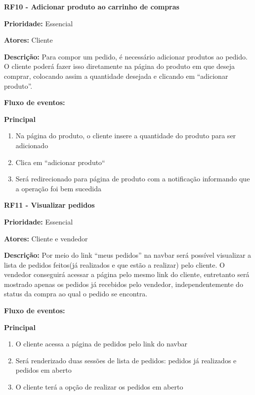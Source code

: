 \begin{apendicesenv}
\textbf{RF10 - Adicionar produto ao carrinho de compras} \par
\textbf{Prioridade:} Essencial \par
\textbf{Atores:} Cliente \par
\textbf{Descrição:} Para compor um pedido, é necessário adicionar produtos ao pedido. O cliente poderá fazer isso diretamente na página do produto em que deseja comprar, colocando assim a quantidade desejada e clicando em “adicionar produto”. \par
\textbf{Fluxo de eventos:} \par
\textbf{Principal} \par
\begin{enumerate}
  \item Na página do produto, o cliente insere a quantidade do produto para ser adicionado
  \item Clica em “adicionar produto“
  \item Será redirecionado para página de produto com a notificação informando que a operação foi bem sucedida
\end{enumerate}

\textbf{RF11 - Visualizar pedidos} \par
\textbf{Prioridade:} Essencial \par
\textbf{Atores:} Cliente e vendedor \par
\textbf{Descrição:} Por meio do link “meus pedidos” na navbar será possível visualizar a lista de pedidos feitos(já realizados e que estão a realizar) pelo cliente. O vendedor conseguirá acessar a página pelo mesmo link do cliente, entretanto será mostrado apenas os pedidos já recebidos pelo vendedor, independentemente do status da compra ao qual o pedido se encontra. \par
\textbf{Fluxo de eventos:} \par
\textbf{Principal} \par
\begin{enumerate}
  \item O cliente acessa a página de pedidos pelo link do navbar
  \item Será renderizado duas sessões de lista de pedidos: pedidos já realizados e pedidos em aberto
  \item O cliente terá a opção de realizar os pedidos em aberto
\end{enumerate}


\end{apendicesenv}
